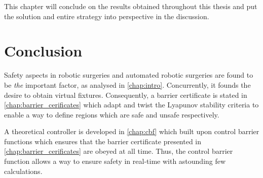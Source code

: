 This chapter will conclude on the results obtained throughout this thesis and put the solution and entire strategy into perspective in the discussion.
\section*{Conclusion}
Safety aspects in robotic surgeries and automated robotic surgeries are found to be \textit{the} important factor, as analysed in \autoref{chap:intro}. Concurrently, it founds the desire to obtain virtual fixtures. Consequently, a barrier certificate is stated in \autoref{chap:barrier_cerificates} which adapt and twist the Lyapunov stability criteria to enable a way to define regions which are safe and unsafe respectively. 

A theoretical controller is developed in \autoref{chap:cbf} which built upon control barrier functions which ensures that the barrier certificate presented in \autoref{chap:barrier_cerificates} are obeyed at all time. Thus, the control barrier function allows a way to ensure safety in real-time with astounding few calculations.

